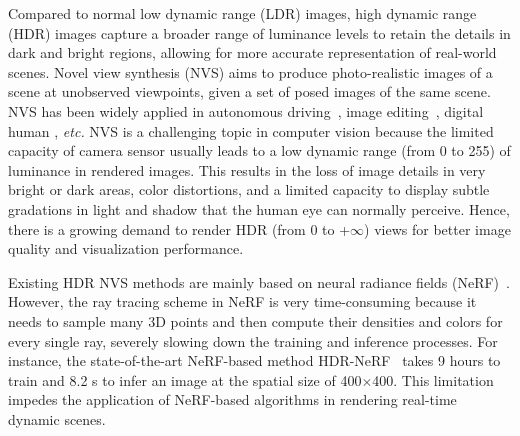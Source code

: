 \documentclass{article}
\begin{document}
Compared to normal low dynamic range (LDR) images, high dynamic range (HDR) images capture a broader range of luminance levels to retain the details in dark and bright regions, allowing for more accurate representation of real-world scenes. Novel view synthesis (NVS) aims to produce photo-realistic images of a scene at unobserved viewpoints, given a set of posed images of the same scene. NVS has been widely applied in autonomous driving~\cite{nvs_ad_1,nvs_ad_2,nvs_ad_3,nvs_ad_4}, image editing~\cite{nvs_edit_1,nvs_edit_2,nvs_edit_3,nvs_edit_4}, digital human \cite{nvs_human_1,nvs_human_2,nvs_human_3,nvs_human_4}, \emph{etc.} NVS is a challenging topic in computer vision because the limited capacity of camera sensor usually leads to a low dynamic range (from 0 to 255) of luminance in rendered images. This results in the loss of image details in very bright or dark areas, color distortions, and a limited capacity to display subtle gradations in light and shadow that the human eye can normally perceive. Hence, there is a growing demand to render HDR (from 0 to +$\infty$) views for better image quality and visualization performance.



Existing HDR NVS methods are mainly based on neural radiance fields (NeRF)~\cite{nerf}. %
However, the ray tracing scheme in NeRF is very time-consuming because it needs to sample many 3D points and then compute their densities and colors for every single ray, severely slowing down the training and inference processes. For instance, the state-of-the-art NeRF-based method HDR-NeRF~\cite{hdr_nerf} takes 9 hours to train and 8.2 s to infer an image at the spatial size of 400$\times$400. This limitation impedes the application of NeRF-based algorithms in rendering real-time dynamic scenes.
\end{document}
